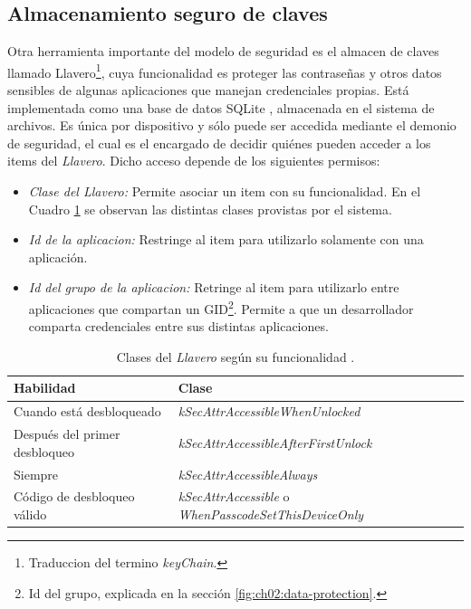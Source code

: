 \subsection{Almacenamiento seguro de claves}
Otra herramienta importante del modelo de seguridad es el almacen de claves llamado Llavero\footnote{Traduccion del termino \textit{keyChain}.}, cuya funcionalidad es proteger las contraseñas y otros datos sensibles de algunas aplicaciones que manejan credenciales propias. Est\'a implementada como una base de datos SQLite \cite{asg}, almacenada en el sistema de archivos. Es única por dispositivo y sólo puede ser accedida mediante el demonio de seguridad, el cual es el encargado de decidir quiénes pueden acceder a los items del \textit{Llavero}. Dicho acceso depende de los siguientes permisos:
\begin{itemize}
\item \emph{Clase del \textit{Llavero}:} Permite asociar un item con su funcionalidad. En el Cuadro \ref{tab:ch02:keychain-classes} se observan las distintas clases provistas por el sistema.
\item \emph{Id de la aplicacion:} Restringe al item para utilizarlo solamente con una aplicaci\'on.
\item \emph{Id del grupo de la aplicacion:} Retringe al item para utilizarlo entre aplicaciones que compartan un GID\footnote{Id del grupo, explicada en la secci\'on \ref{fig:ch02:data-protection}.}. Permite a que un desarrollador comparta credenciales entre sus distintas aplicaciones.
\end{itemize}
\begin{table}[hbtp]
    \centering
    \begin{tabular}{l l}
\textbf{Habilidad}    &    \textbf{Clase}   \\ \hline
Cuando est\'a desbloqueado    &   \textit{kSecAttrAccessibleWhenUnlocked} \\
Despu\'es del primer desbloqueo    &    \textit{kSecAttrAccessibleAfterFirstUnlock} \\
Siempre    &   \textit{kSecAttrAccessibleAlways}    \\
C\'odigo de desbloqueo v\'alido    &    \textit{kSecAttrAccessible} o \textit{WhenPasscodeSetThisDeviceOnly}
    \end{tabular}
    \caption{Clases del \textit{Llavero} seg\'un su funcionalidad \cite{asg}.}
    \label{tab:ch02:keychain-classes}
\end{table}
